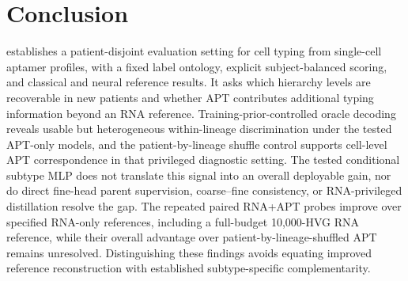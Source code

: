 \section{Conclusion}
\label{sec:conclusion}

\ourbench{} establishes a patient-disjoint evaluation setting for cell typing
from single-cell aptamer profiles, with a fixed label ontology, explicit
subject-balanced scoring, and classical and neural reference results.
It asks which hierarchy levels are recoverable in new patients and whether
APT contributes additional typing information beyond an RNA reference.
Training-prior-controlled oracle decoding reveals usable but heterogeneous
within-lineage discrimination under the tested APT-only models, and the
patient-by-lineage shuffle control supports cell-level APT correspondence in
that privileged diagnostic setting. The tested conditional subtype MLP does
not translate this signal into an overall deployable gain, nor do direct
fine-head parent supervision, coarse--fine consistency, or RNA-privileged
distillation resolve the gap. The repeated paired RNA+APT probes improve over
specified RNA-only references, including a full-budget 10{,}000-HVG RNA
reference, while their overall advantage over patient-by-lineage-shuffled APT
remains unresolved. Distinguishing these findings avoids equating improved
reference reconstruction with established subtype-specific complementarity.
